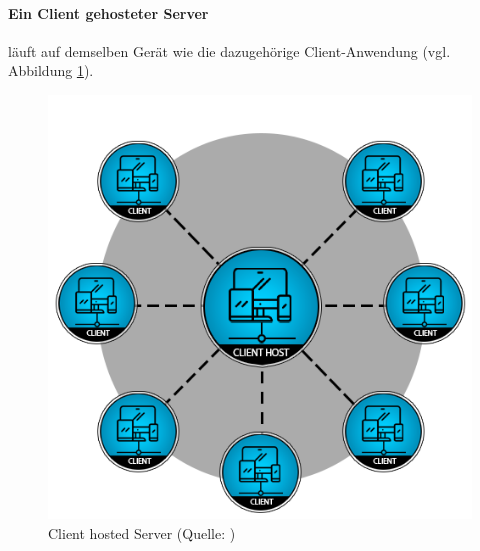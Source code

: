 \paragraph{Ein Client gehosteter Server} läuft auf demselben Gerät wie die dazugehörige Client-Anwendung (vgl. Abbildung \ref{fig:client_server}).

\begin{figure}[ht]
\centering
\includegraphics[width=1\linewidth]{content/pictures/client-hosted-16be0b1c9b5020f21325b1e6a7beca73.png}
\caption{Client hosted Server (Quelle: \cite{noauthor_network_2024})}
\label{fig:client_server}
\end{figure}



